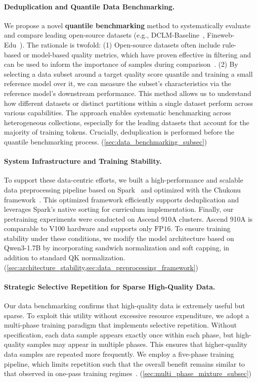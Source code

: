 \paragraph{Deduplication and Quantile Data Benchmarking.}
We propose a novel \textbf{quantile benchmarking} method to systematically evaluate and compare leading open-source datasets (e.g., DCLM-Baseline~\citep{DCLM}, Fineweb-Edu~\citep{fineweb}). The rationale is twofold: (1) Open-source datasets often include rule-based or model-based quality metrics, which have proven effective in filtering and can be used to inform the importance of samples during comparison~\citep{fineweb,DCLM}. (2) By selecting a data subset around a target quality score quantile and training a small reference model over it, we can measure the subset's characteristics via the reference model's downstream performance. This method allows us to understand how different datasets or distinct partitions within a single dataset perform across various capabilities. The approach enables systematic benchmarking across heterogeneous collections, especially for the leading datasets that account for the majority of training tokens. Crucially, deduplication is performed before the quantile benchmarking process. (\cref{sec:data_benchmarking_subsec})

\paragraph{System Infrastructure and Training Stability.}
To support these data-centric efforts, we built a high-performance and scalable data preprocessing pipeline based on Spark~\citep{zaharia2012spark} and optimized with the Chukonu framework~\citep{chukonu}. This optimized framework efficiently supports deduplication and leverages Spark's native sorting for curriculum implementation.
Finally, our pretraining experiments were conducted on Ascend 910A clusters. Ascend 910A is comparable to V100 hardware and supports only $\text{FP}16$. To ensure training stability under these conditions, we modify the model architecture based on Qwen3-1.7B by incorporating sandwich normalization and soft capping, in addition to standard $\text{QK}$ normalization. (\cref{sec:architecture_stability,sec:data_preprocessing_framework})

\paragraph{Strategic Selective Repetition for Sparse High-Quality Data.}
Our data benchmarking confirms that high-quality data is extremely useful but sparse. To exploit this utility without excessive resource expenditure, we adopt a multi-phase training paradigm that implements selective repetition.
Without specification, each data sample appears exactly once within each phase, but high-quality samples may appear in multiple phases.
This ensures that higher-quality data samples are repeated more frequently. We employ a five-phase training pipeline, which limits repetition such that the overall benefit remains similar to that observed in one-pass training regimes~\citep{muennighoff2023data_constrained,yan2025largerdatasetsrepeatedmore}. (\cref{sec:multi_phase_mixture_subsec})

